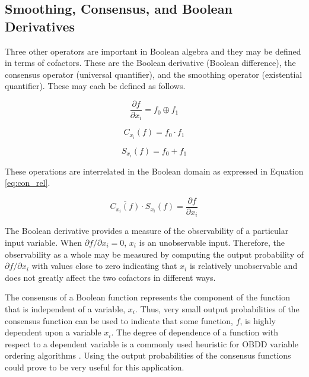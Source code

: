 \subsection{Smoothing, Consensus, and Boolean Derivatives}
Three other operators are important in Boolean algebra and they may be defined
in terms of cofactors.  These are the Boolean derivative (Boolean difference), 
the consensus operator (universal quantifier), and the smoothing operator
(existential quantifier).
These may each be defined as follows.

\begin{equation}
\frac{\partial{f}}{\partial{x_i}} = f_0 \oplus f_1  \label{eq:bool_diff}
\end{equation}

\begin{equation}
C_{x_i}(f) = f_0 \cdot f_1  \label{eq:bool_con}
\end{equation}

\begin{equation}
S_{x_i}(f) = f_0 + f_1 \label{eq:bool_smooth}
\end{equation}

These operations are interrelated in the Boolean domain as expressed in Equation \ref{eq:con_rel}.

\begin{equation}
\overline{C_{x_i}(f)} \cdot S_{x_i}(f) = \frac{\partial{f}}{\partial{x_i}} \label{eq:con_rel}
\end{equation}

The Boolean derivative provides a measure of the observability of a particular
input variable.  When $\partial{f}/\partial{x_i}=0$, $x_i$ is an unobservable
input.  Therefore, the observability as a whole may be measured by computing
the output probability of $\partial{f}/\partial{x_i}$ with values close to
zero indicating that $x_i$ is relatively unobservable and does not greatly affect the two
cofactors in different ways.  

The consensus of a Boolean function represents the component of the function that is
independent of a variable, $x_i$.  Thus, very small output probabilities of the consensus
function can be used to indicate that some function, $f$, is highly dependent upon a variable
$x_i$.  The degree of dependence of a function with respect to a dependent variable is a commonly used
heuristic for OBDD variable ordering algorithms \cite{SM92}.  Using the output
probabilities of the consensus functions could prove to be very useful for this application.

